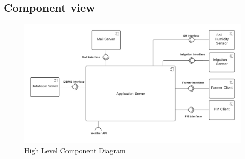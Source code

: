 \documentclass[10pt]{article} %
\begin{document}
\subsection{Component view}
\begin{figure}[h]
    \centering
    \includegraphics[scale=0.58]{images/hl_component.png}
    \caption{High Level Component Diagram}
    \label{fig:hl_component}
\end{figure}
\end{document}
